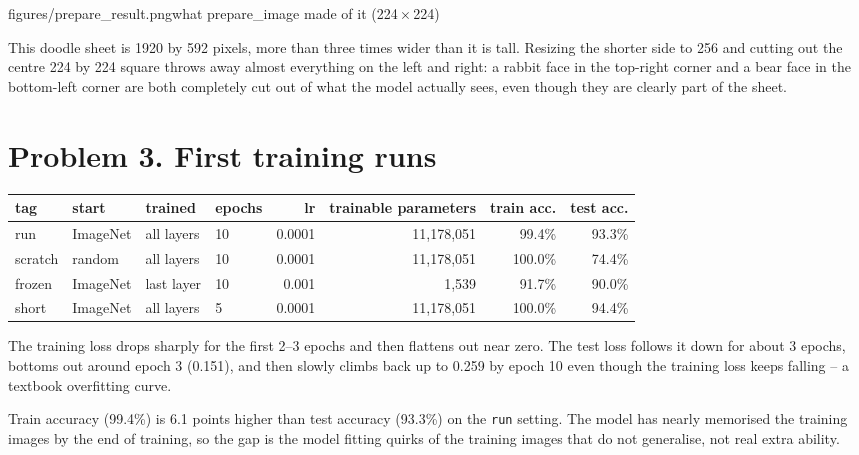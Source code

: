 \documentclass[11pt]{article}
\begin{document}
           {figures/prepare_result.png}{what prepare\_image made of it (224\,$\times$\,224)}

This doodle sheet is 1920 by 592 pixels, more than three times wider than it
is tall. Resizing the shorter side to 256 and cutting out the centre 224 by
224 square throws away almost everything on the left and right: a rabbit face
in the top-right corner and a bear face in the bottom-left corner are both
completely cut out of what the model actually sees, even though they are
clearly part of the sheet.

\section*{Problem 3. First training runs}

\begin{center}\footnotesize
\begin{tabular}{llllrrrr}
\toprule
tag & start & trained & epochs & lr & trainable parameters & train acc. & test acc. \\
\midrule
run     & ImageNet & all layers  & 10 & 0.0001 & 11,178,051 & 99.4\%  & 93.3\% \\
scratch & random   & all layers  & 10 & 0.0001 & 11,178,051 & 100.0\% & 74.4\% \\
frozen  & ImageNet & last layer  & 10 & 0.001  & 1,539      & 91.7\%  & 90.0\% \\
short   & ImageNet & all layers  & 5  & 0.0001 & 11,178,051 & 100.0\% & 94.4\% \\
\bottomrule
\end{tabular}
\end{center}


The training loss drops sharply for the first 2--3 epochs and then flattens
out near zero. The test loss follows it down for about 3 epochs, bottoms out
around epoch 3 (0.151), and then slowly climbs back up to 0.259 by epoch 10
even though the training loss keeps falling -- a textbook overfitting curve.

Train accuracy (99.4\%) is 6.1 points higher than test accuracy (93.3\%) on
the \texttt{run} setting. The model has nearly memorised the training images
by the end of training, so the gap is the model fitting quirks of the
training images that do not generalise, not real extra ability.
\end{document}
